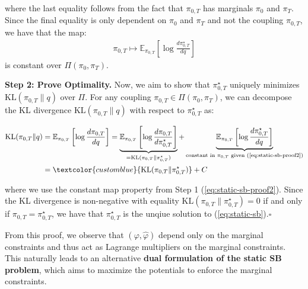 \documentclass{article}
\newcommand{\boldtext}[1]{\textbf{\textcolor{MyGreen}{#1}}}
\newcommand{\bluetext}[1]{\textcolor{customblue}{#1}}
\begin{document}
where the last equality follows from the fact that $\pi_{0,T}$ has marginals $\pi_0$ and $\pi_T$. Since the final equality is only dependent on $\pi_0$ and $\pi_T$ and not the coupling $\pi_{0,T}$, we have that the map:
\begin{align}
    \pi_{0,T}\mapsto \mathbb{E}_{\pi_{0,T}}\left[\log \frac{d\pi_{0,T}^\star}{dq}\right]\label{eq:static-sb-proof2}
\end{align}
is constant over $\Pi(\pi_0, \pi_T)$. 

\textbf{Step 2: Prove Optimality.} 
Now, we aim to show that $\pi^\star_{0,T}$ uniquely minimizes $\text{KL}(\pi_{0,T}\|q)$ over $\Pi$. For any coupling $\pi_{0,T}\in \Pi(\pi_0, \pi_T)$, we can decompose the KL divergence $\text{KL}(\pi_{0,T}\|q)$ with respect to $\pi^\star_{0,T}$ as:
\begin{small}
\begin{align}
    \text{KL}(\pi_{0,T}\|q)&=\mathbb{E}_{\pi_{0,T}}\left[\log \frac{d\pi_{0,T}}{dq}\right]=\underbrace{\mathbb{E}_{\pi_{0,T}}\left[\log \frac{d\pi_{0,T}}{d\pi^\star_{0,T}}\right]}_{=\text{KL}(\pi_{0,T}\|\pi_{0,T}^\star)}+\underbrace{\mathbb{E}_{\pi_{0,T}}\left[\log \frac{d\pi^\star_{0,T}}{dq}\right]}_{\text{constant in }\pi_{0,T}\text{ given (\ref{eq:static-sb-proof2})}}\nonumber\\
    &=\bluetext{\text{KL}(\pi_{0,T}\|\pi_{0,T}^\star)}+C
\end{align}
\end{small}
where we use the constant map property from Step 1 (\ref{eq:static-sb-proof2}). Since the KL divergence is non-negative with equality $\text{KL}(\pi_{0,T}\|\pi_{0,T}^\star)=0$ if and only if $\pi_{0,T}=\pi^\star_{0,T}$, we have that $\pi^\star_{0,T}$ is the unqiue solution to (\ref{eq:static-sb}).\hfill $\square$

From this proof, we observe that $(\varphi, \hat\varphi)$ depend only on the marginal constraints and thus act as Lagrange multipliers on the marginal constraints. This naturally leads to an alternative \boldtext{dual formulation of the static SB problem}, which aims to maximize the potentials to enforce the marginal constraints.
\end{document}
